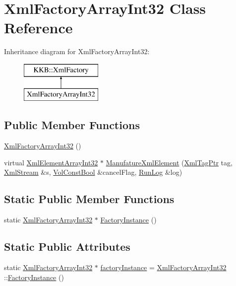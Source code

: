 \hypertarget{class_xml_factory_array_int32}{}\section{Xml\+Factory\+Array\+Int32 Class Reference}
\label{class_xml_factory_array_int32}
Inheritance diagram for Xml\+Factory\+Array\+Int32\+:\begin{figure}[H]
\begin{center}
\leavevmode
\includegraphics[height=2.000000cm]{class_xml_factory_array_int32}
\end{center}
\end{figure}
\subsection*{Public Member Functions}
\begin{DoxyCompactItemize}
\item 
\hyperlink{class_xml_factory_array_int32_ac6652a263b4f347abfcaca2bcdf8eccc}{Xml\+Factory\+Array\+Int32} ()
\item 
virtual \hyperlink{class_k_k_b_1_1_xml_element_array_int32}{Xml\+Element\+Array\+Int32} $\ast$ \hyperlink{class_xml_factory_array_int32_a5b256addde1b83b512fd3ead6ad80bad}{Manufature\+Xml\+Element} (\hyperlink{namespace_k_k_b_a9253a3ea8a5da18ca82be4ca2b390ef0}{Xml\+Tag\+Ptr} tag, \hyperlink{class_k_k_b_1_1_xml_stream}{Xml\+Stream} \&s, \hyperlink{namespace_k_k_b_a7d390f568e2831fb76b86b56c87bf92f}{Vol\+Const\+Bool} \&cancel\+Flag, \hyperlink{class_k_k_b_1_1_run_log}{Run\+Log} \&log)
\end{DoxyCompactItemize}
\subsection*{Static Public Member Functions}
\begin{DoxyCompactItemize}
\item 
static \hyperlink{class_xml_factory_array_int32}{Xml\+Factory\+Array\+Int32} $\ast$ \hyperlink{class_xml_factory_array_int32_a0babe49c6fcda4375488b1824317a1df}{Factory\+Instance} ()
\end{DoxyCompactItemize}
\subsection*{Static Public Attributes}
\begin{DoxyCompactItemize}
\item 
static \hyperlink{class_xml_factory_array_int32}{Xml\+Factory\+Array\+Int32} $\ast$ \hyperlink{class_xml_factory_array_int32_aa7417be06de8f97c9b0d1a66debe09a5}{factory\+Instance} = \hyperlink{class_xml_factory_array_int32}{Xml\+Factory\+Array\+Int32} \+::\hyperlink{class_xml_factory_array_int32_a0babe49c6fcda4375488b1824317a1df}{Factory\+Instance} ()
\end{DoxyCompactItemize}



